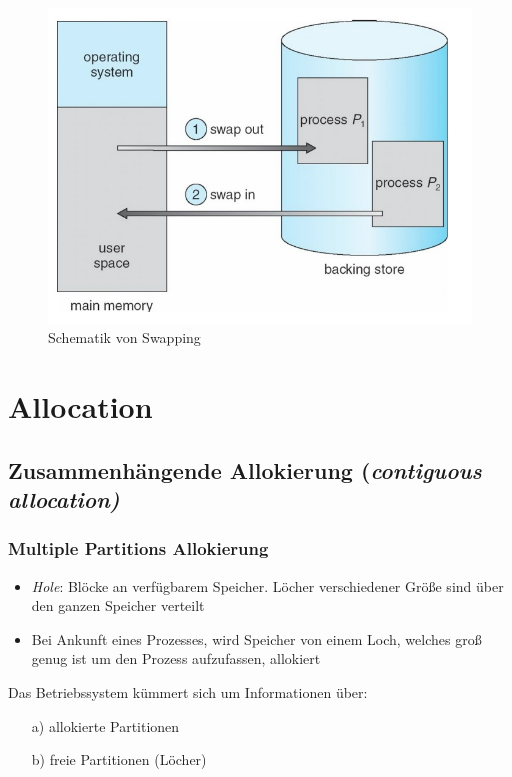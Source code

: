 \documentclass[a4paper]{scrreprt}
\begin{document}
\begin{figure}[ht]
\centering
\includegraphics[scale=0.6]{swapping.png}
\caption{Schematik von Swapping}
\end{figure}

\section{Allocation}
\subsection{Zusammenhängende Allokierung (\textit{contiguous allocation)}}
\subsubsection{Multiple Partitions Allokierung}
\begin{itemize}
\item \textit{Hole}: Blöcke an verfügbarem Speicher. Löcher verschiedener Größe sind über den ganzen Speicher verteilt
\item Bei Ankunft eines Prozesses, wird Speicher von einem Loch, welches groß genug ist um den Prozess aufzufassen, allokiert
\end{itemize} Das Betriebssystem kümmert sich um Informationen über:

\begin{itemize}
\item[a)] allokierte Partitionen
\item[b)] freie Partitionen (Löcher)
\end{itemize}
\end{document}
